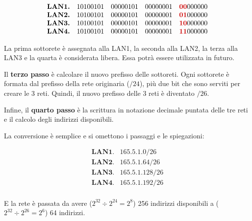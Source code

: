 \documentclass[a4paper]{article}
\newcommand{\binaryaddress}[4]{#1 \hspace{1em} #2 \hspace{1em} #3 \hspace{1em} #4}
\begin{document}
	\begin{equation*}
		\begin{array}{ll}
			\textbf{LAN1.} & \binaryaddress{10100101}{00000101}{00000001}{\textcolor{Red3}{\boldsymbol{00}}000000} \\
			\textbf{LAN2.} & \binaryaddress{10100101}{00000101}{00000001}{\textcolor{Red3}{\boldsymbol{01}}000000} \\
			\textbf{LAN3.} & \binaryaddress{10100101}{00000101}{00000001}{\textcolor{Red3}{\boldsymbol{10}}000000} \\
			\textbf{LAN4.} & \binaryaddress{10100101}{00000101}{00000001}{\textcolor{Red3}{\boldsymbol{11}}000000} \\
		\end{array}
	\end{equation*}

	\noindent
	La prima sottorete è assegnata alla LAN1, la seconda alla LAN2, la terza alla LAN3 e la quarta è considerata libera. Essa potrà essere utilizzata in futuro.\newline
	
	\noindent
	Il \textbf{terzo passo} è calcolare il nuovo prefisso delle sottoreti. Ogni sottorete è formata dal prefisso della rete originaria ($/24$), più due bit che sono serviti per creare le 3 reti. Quindi, il nuovo prefisso delle 3 reti è diventato $/26$.\newline
	
	\noindent
	Infine, il \textbf{quarto passo} è la scrittura in notazione decimale puntata delle tre reti e il calcolo degli indirizzi disponibili.\newline
	
	\noindent
	La conversione è semplice e si omettono i passaggi e le spiegazioni:
	
	\begin{equation*}
		\begin{array}{ll}
			\textbf{LAN1.} & 165.5.1.0/26 \\
			\textbf{LAN2.} & 165.5.1.64/26 \\
			\textbf{LAN3.} & 165.5.1.128/26 \\
			\textbf{LAN4.} & 165.5.1.192/26 \\
		\end{array}
	\end{equation*}

	\noindent
	E la rete è passata da avere ($2^{32} \div 2^{24} = 2^{8}$) 256 indirizzi disponibili a ($2^{32} \div 2^{26} = 2^{6}$) 64 indirizzi.
	
\end{document}
